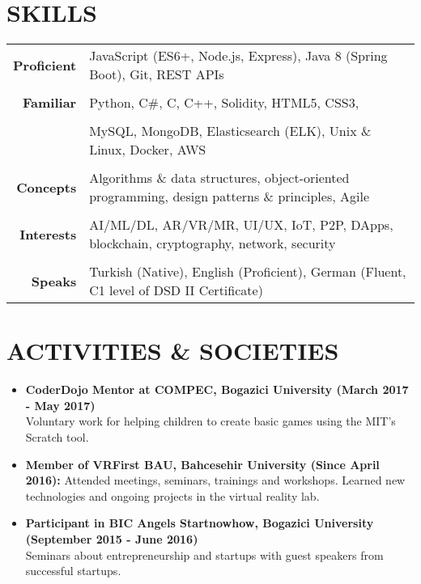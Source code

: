 \documentclass[a4paper, 10pt]{article}
\begin{document}
\section{SKILLS}
{\renewcommand{\arraystretch}{0.7}
\begin{tabular}{r p{15.4cm}}
    \textbf{Proficient} & JavaScript (ES6+, Node.js, Express), Java 8 (Spring Boot), Git, REST APIs\\\\
    \textbf{Familiar} & Python, C\#, C, C++, Solidity, HTML5, CSS3,\\\\
    & MySQL, MongoDB, Elasticsearch (ELK), Unix \& Linux, Docker, AWS\\\\
    \textbf{Concepts} & Algorithms \& data structures, object-oriented programming, design patterns \& principles, Agile\\\\
    \textbf{Interests} & AI/ML/DL, AR/VR/MR, UI/UX, IoT, P2P, DApps, blockchain, cryptography, network, security\\\\
    \textbf{Speaks} & Turkish (Native), English (Proficient), German (Fluent, C1 level of DSD II Certificate)
\end{tabular}}

\section{ACTIVITIES \& SOCIETIES}
\begin{itemize}
    \item \textbf{CoderDojo Mentor at COMPEC, Bogazici University (March 2017 - May 2017)}\\
        Voluntary work for helping children to create basic games using the MIT's Scratch tool.
    \item \textbf{Member of VRFirst BAU, Bahcesehir University (Since April 2016):}
        Attended meetings, seminars, trainings and workshops. Learned new technologies and ongoing projects in the virtual reality lab.
    \item \textbf{Participant in BIC Angels Startnowhow, Bogazici University (September 2015 - June 2016)}\\
        Seminars about entrepreneurship and startups with guest speakers from successful startups.
\end{itemize}
\end{document}
